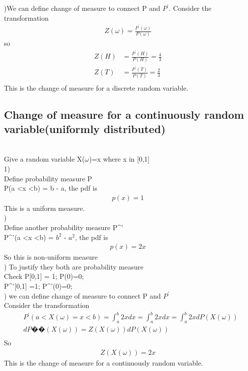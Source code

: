 \documentclass[a4paper]{article}
\begin{document}
)We can define change of measure to connect P and $P^{'}$. Consider the transformation 
\begin{align*}
	Z(\omega) = \frac{P^{'}(\omega)}{P(\omega)}
\end{align*}
so 
\begin{align*}
	Z(H) & = \frac{P^{'}(H)}{P(H)} = \frac{4}{3}\\
	Z(T) & = \frac{P^{'}(T)}{P(T)} = \frac{2}{3}\\
\end{align*}
This is the change of measure for a discrete random variable. \\
\subsection{Change of measure for a continuously random variable(uniformly distributed) } \\

Give a random variable  X($\omega$)=x where x in [0,1]\\
1)	\\
Define probability measure P \\
P(a \textless x \textless b) = b - a, the pdf is 
\begin{align*}
p(x) = 1	
\end{align*}
This is a uniform measure.\\

)\\
Define another probability measure P^{'}\\
P^{'}(a \textless x  \textless b) = $b^2$ - $a^2$, the pdf is 
\begin{align*}
p(x) = 2x
\end{align*}
So this is non-uniform measure\\


)	To justify they both are probability measure\\
Check  P[0,1] = 1; P(0)=0;\\
       P^{'}[0,1] =1; P^{'}(0)=0;\\


) we can define change of measure to connect P and $P^{'}$ \\
Consider the transformation \\
\begin{align*}
	&P^{'}(a < X(\omega) = x < b) = \int _a ^b 2x dx = \int _a ^b 2x dx = \int_a ^b 2x dP(X(\omega))\\
	&dP{��}(X(\omega)) = Z(X(\omega)) dP(X(\omega)) \\
\end{align*}
So
\begin{align*}
	Z(X(\omega))= 2x
\end{align*}
This is the change of measure for a continuously random variable. \\
\end{document}

